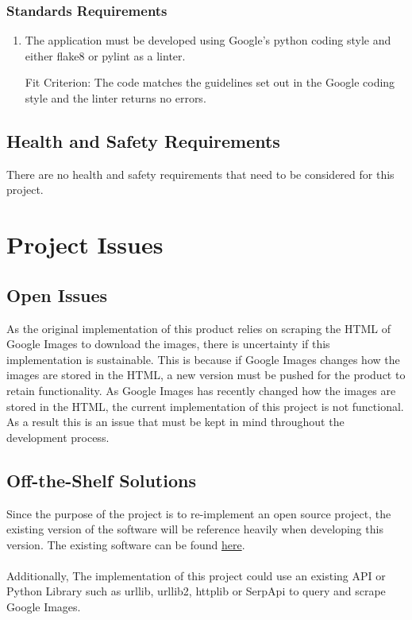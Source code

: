 \documentclass[12pt, titlepage]{article}
\begin{document}
\subsubsection{Standards Requirements}
\begin{enumerate}[label=SR\arabic*:, wide=0pt, leftmargin=*]
    \item The application must be developed using Google's python coding style and either flake8 or pylint as a linter.
    \item [Fit Criterion:] The code matches the guidelines set out in the Google coding style and the linter returns no errors.
\end{enumerate}

\subsection{Health and Safety Requirements}

There are no health and safety requirements that need to be considered for this project.

\section{Project Issues}

\subsection{Open Issues}

As the original implementation of this product relies on scraping the HTML of Google Images to download the images, there is uncertainty if this implementation is sustainable. This is because if Google Images changes how the images are stored in the HTML, a new version must be pushed for the product to retain functionality. As Google Images has recently changed how the images are stored in the HTML, the current implementation of this project is not functional. As a result this is an issue that must be kept in mind throughout the development process.

\subsection{Off-the-Shelf Solutions}

Since the purpose of the project is to re-implement an open source project, the existing version of the software will be reference heavily when developing  this  version.   The existing software can be found \href{https://github.com/hardikvasa/google-images-download.}{here}.
\\
\\
Additionally, The implementation of this project could use an existing API or Python Library such as urllib, urllib2, httplib or SerpApi to query  and scrape Google Images.
\end{document}
